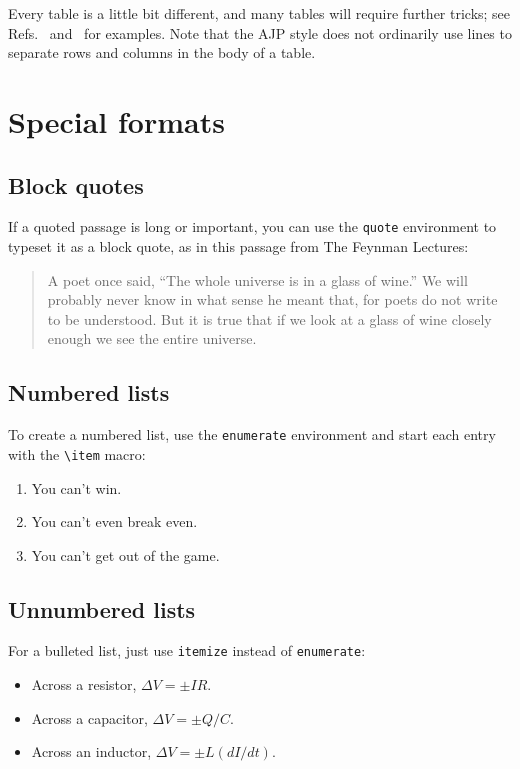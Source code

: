 \documentclass[prb,preprint]{revtex4-2}
\begin{document}
Every table is a little bit different, and many tables will require
further tricks; see Refs.\  and~
for examples.  Note that the AJP style does not ordinarily use lines 
to separate rows and columns in the body of a table.


\section{Special formats}

\subsection{Block quotes}  %

If a quoted passage is long or important, you can use the \texttt{quote} 
environment to typeset it as a block quote, as in this passage from The 
Feynman Lectures:\cite{feynman}
\begin{quote}
A poet once said, ``The whole universe is in a glass of wine.'' We will 
probably never know in what sense he meant that, for poets do not write 
to be understood. But it is true that if we look at a glass of wine closely 
enough we see the entire universe.
\end{quote}

\subsection{Numbered lists}

To create a numbered list, use the \texttt{enumerate} environment and start
each entry with the \verb/\item/ macro:
\begin{enumerate}
\item You can't win.
\item You can't even break even.
\item You can't get out of the game.
\end{enumerate}

\subsection{Unnumbered lists}

For a bulleted list, just use \texttt{itemize} instead of \texttt{enumerate}:
\begin{itemize}
\item Across a resistor, $\Delta V = \pm IR$.
\item Across a capacitor, $\Delta V = \pm Q/C$.
\item Across an inductor, $\Delta V = \pm L(dI/dt)$.
\end{itemize}
\end{document}
